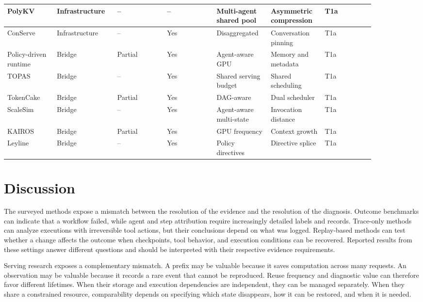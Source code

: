 \documentclass[preprint,12pt]{elsarticle}
\begin{document}
\begin{center}
\begin{longtable}{|p{0.126\linewidth}|p{0.126\linewidth}|p{0.126\linewidth}|p{0.126\linewidth}|p{0.126\linewidth}|p{0.126\linewidth}|p{0.126\linewidth}|}
PolyKV & Infrastructure & -- & -- & Multi-agent shared pool & Asymmetric compression & T1a \\ \hline
ConServe & Infrastructure & -- & Yes & Disaggregated & Conversation pinning & T1a \\ \hline
Policy-driven runtime & Bridge & Partial & Yes & Agent-aware GPU & Memory and metadata & T1a \\ \hline
TOPAS & Bridge & -- & Yes & Shared serving budget & Shared scheduling & T1a \\ \hline
TokenCake & Bridge & Partial & Yes & DAG-aware & Dual scheduler & T1a \\ \hline
ScaleSim & Bridge & -- & Yes & Agent-aware multi-state & Invocation distance & T1a \\ \hline
KAIROS & Bridge & Partial & Yes & GPU frequency & Context growth & T1a \\ \hline
Leyline & Bridge & -- & Yes & Policy directives & Directive splice & T1a \\ \hline
\end{longtable}
\endgroup
\end{center}

\section{Discussion}
The surveyed methods expose a mismatch between the resolution of the evidence and the resolution of the diagnosis. Outcome benchmarks can indicate that a workflow failed, while agent and step attribution require increasingly detailed labels and records. Trace-only methods can analyze executions with irreversible tool actions, but their conclusions depend on what was logged. Replay-based methods can test whether a change affects the outcome when checkpoints, tool behavior, and execution conditions can be recovered. Reported results from these settings answer different questions and should be interpreted with their respective evidence requirements.

Serving research exposes a complementary mismatch. A prefix may be valuable because it saves computation across many requests. An observation may be valuable because it records a rare event that cannot be reproduced. Reuse frequency and diagnostic value can therefore favor different lifetimes. When their storage and execution dependencies are independent, they can be managed separately. When they share a constrained resource, comparability depends on specifying which state disappears, how it can be restored, and when it is needed.
\end{document}

